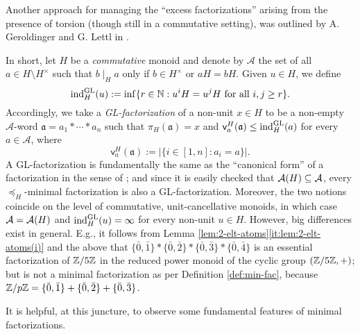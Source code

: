 \begin{rk}\label{rem:geroldinger&lettl}
Another approach for managing the ``excess factorizations'' arising from the presence of torsion (though still in a commutative setting), was outlined by A. Geroldinger and G. Lettl in \cite{geroldinger-lettl90}. 

In short, let $H$ be a \emph{commutative} monoid and denote by $\mathcal A$ the set of all $a \in H \setminus H^\times$ such that $b \mid_H a$ only if $b \in H^\times$ or $aH = bH$. Given $u \in H$, we define 
\[
\textrm{ind}_H^{\rm GL}(u) := \inf \{r\in \mathbb{N}: u^i H = u^j H \textrm{ for all } i, j \ge r\}.
\]
Accordingly, we take a \emph{\textup{GL}-factorization} of a non-unit $x \in H$ to be a non-empty $\mathcal A$-word $\mathfrak a = a_1 \ast \cdots \ast a_n$ such that $\pi_H(\mathfrak a) = x$ and $\mathsf v_a^H(\mathfrak a) \le \text{ind}_H^{\rm GL}(a)$ for every $a \in \mathcal A$, where
\[
\mathsf v_a^H(\mathfrak a) := \bigl|\{i \in [ 1, n ]: a_i = a\}\bigr|.
\]
A \textup{GL}-factorization is fundamentally the same as the ``canonical form'' of a factorization in the sense of \cite{geroldinger-lettl90}; and since it is easily checked that $\mathcal{A}(H) \subseteq \mathcal A$, every $\preceq_H$-minimal factorization is also a \textup{GL}-factorization. Moreover, the two notions coincide on the level of commutative, unit-cancellative monoids, in which case $\mathcal A = \mathcal{A}(H)$ and $\text{ind}_H^{\rm GL}(u) = \infty$ for every non-unit $u \in H$.
However, big differences exist in general. E.g., it follows from Lemma \ref{lem:2-elt-atoms}\ref{it:lem:2-elt-atoms(i)} and the above that $\{\bar{0}, \bar{1}\} \ast \{\bar{0}, \bar{2}\} \ast \{\bar{0}, \bar{3}\} \ast \{\bar{0}, \bar{4}\}$ is an essential factorization of $\mathbb{Z}/5\mathbb{Z}$ in the reduced power monoid of the cyclic group $(\mathbb{Z}/5\mathbb{Z}, +)$; but is not a minimal factorization as per Definition \ref{def:min-fac}, because $\mathbb{Z}/p\mathbb{Z} = \{\bar{0}, \bar{1}\} + \{\bar{0}, \bar{2}\} + \{\bar{0}, \bar{3}\}$.
\end{rk}
%
It is helpful, at this juncture, to observe some fundamental features of minimal factorizations.
%
